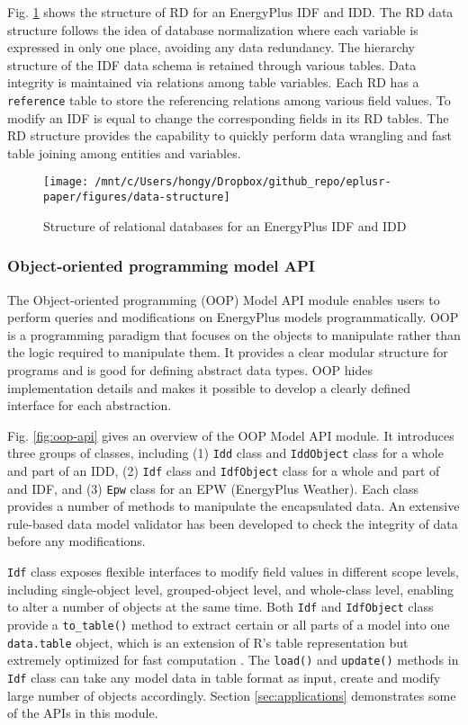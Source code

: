\documentclass[3p, times]{elsarticle} %
\begin{document}
Fig. \ref{fig:data-structure} shows the structure of RD for an EnergyPlus IDF
and IDD.
The RD data structure follows the idea of database normalization where each
variable is expressed in only one place, avoiding any data redundancy.
The hierarchy structure of the IDF data schema is retained through various
tables.
Data integrity is maintained via relations among table variables.
Each RD has a \texttt{reference} table to store the referencing relations among
various field values.
To modify an IDF is equal to change the corresponding fields in its RD tables.
The RD structure provides the capability to quickly perform data wrangling and
fast table joining among entities and variables.

\begin{figure}[!htb]
\texttt{[image: /mnt/c/Users/hongy/Dropbox/github\_repo/eplusr-paper/figures/data-structure]} \caption{Structure of relational databases for an EnergyPlus IDF and IDD}\label{fig:data-structure}
\end{figure}

\hypertarget{object-oriented-programming-model-api}{%
\subsubsection{Object-oriented programming model API}\label{object-oriented-programming-model-api}}

The Object-oriented programming (OOP) Model API module enables users to perform
queries and modifications on EnergyPlus models programmatically.
OOP \citep{Wikipedia2020} is a programming paradigm that focuses on the objects to
manipulate rather than the logic required to manipulate them.
It provides a clear modular structure for programs and is good for defining
abstract data types.
OOP hides implementation details and makes it possible to develop a clearly
defined interface for each abstraction.

Fig. \ref{fig:oop-api} gives an overview of the OOP Model API module.
It introduces three groups of classes, including (1) \texttt{Idd} class and
\texttt{IddObject} class for a whole and part of an IDD, (2) \texttt{Idf} class and
\texttt{IdfObject} class for a whole and part of and IDF, and (3) \texttt{Epw} class for an
EPW (EnergyPlus Weather).
Each class provides a number of methods to manipulate the encapsulated data.
An extensive rule-based data model validator has been developed to check the
integrity of data before any modifications.

\texttt{Idf} class exposes flexible interfaces to modify field values in different
scope levels, including single-object level, grouped-object level, and
whole-class level, enabling to alter a number of objects at the same time.
Both \texttt{Idf} and \texttt{IdfObject} class provide a \texttt{to\_table()} method to extract
certain or all parts of a model into one \texttt{data.table} object, which is an
extension of R's table representation but extremely optimized for fast
computation \citep{Dowle2019}.
The \texttt{load()} and \texttt{update()} methods in \texttt{Idf} class can take any model data in
table format as input, create and modify large number of objects accordingly.
Section \ref{sec:applications} demonstrates some of the APIs in this module.
\end{document}
